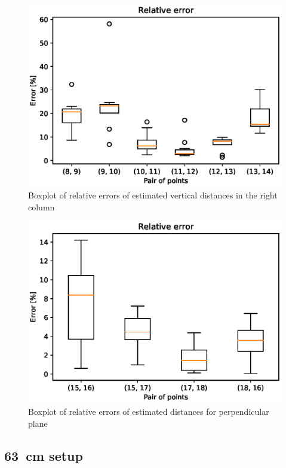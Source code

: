 \begin{figure}
\includegraphics[width=\linewidth]{experiments/rightcolumn.eps}
\caption{Boxplot of relative errors of estimated vertical distances in the right column}
\label{fig:verticalright-boxplot}
\end{figure}

\begin{figure}
\includegraphics[width=\linewidth]{experiments/table.eps}
\caption{Boxplot of relative errors of estimated distances for perpendicular plane}
\label{fig:table-boxplot}
\end{figure}


\subsection*{63~cm setup}
\label{ss:63results}

